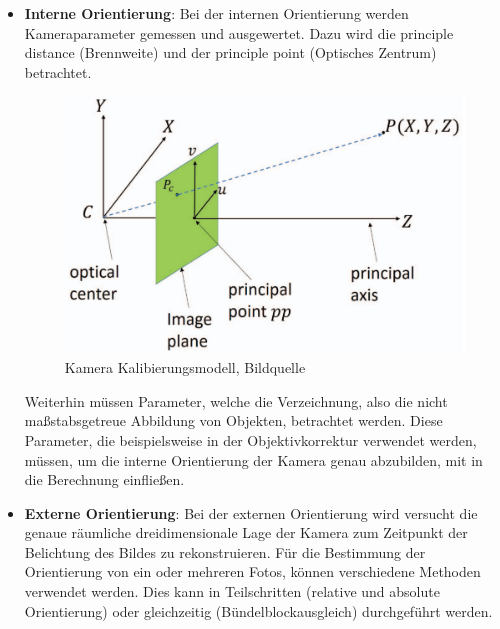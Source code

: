 \begin{itemize}
\item \textbf{Interne Orientierung}: Bei der internen Orientierung werden Kameraparameter gemessen und ausgewertet. Dazu wird die \glqq principle distance\grqq{} (Brennweite) und der \glqq principle point\grqq{} (Optisches Zentrum) betrachtet.

\begin{figure}[H]
	\centering
	\includegraphics[scale=0.45]{pp.png}
	\caption{Kamera Kalibierungsmodell, Bildquelle \cite{pp}}
\end{figure} 

Weiterhin müssen Parameter, welche die Verzeichnung, also die nicht maßstabsgetreue Abbildung von Objekten, betrachtet werden. Diese Parameter, die beispielsweise in der Objektivkorrektur verwendet werden, müssen, um die interne Orientierung der Kamera genau abzubilden, mit in die Berechnung einfließen.

\item \textbf{Externe Orientierung}: Bei der externen Orientierung wird versucht die genaue räumliche dreidimensionale Lage der Kamera zum Zeitpunkt der Belichtung des Bildes zu rekonstruieren. Für die Bestimmung der Orientierung von ein oder mehreren Fotos, können verschiedene Methoden verwendet werden. Dies kann in Teilschritten (relative und absolute Orientierung) oder gleichzeitig (Bündelblockausgleich) durchgeführt werden. 
\end{itemize}

